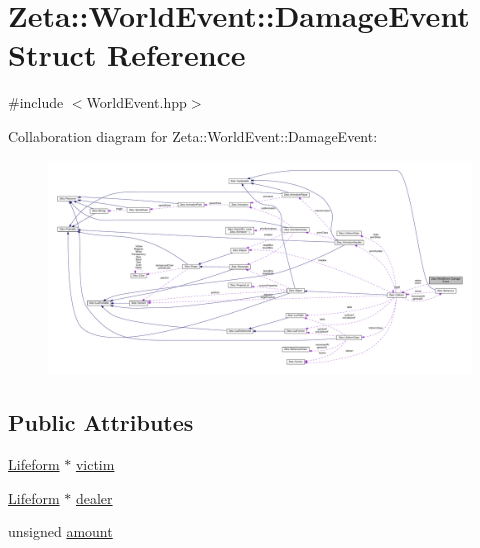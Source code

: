 \hypertarget{structZeta_1_1WorldEvent_1_1DamageEvent}{\section{Zeta\+:\+:World\+Event\+:\+:Damage\+Event Struct Reference}
\label{structZeta_1_1WorldEvent_1_1DamageEvent}
}


{\ttfamily \#include $<$World\+Event.\+hpp$>$}



Collaboration diagram for Zeta\+:\+:World\+Event\+:\+:Damage\+Event\+:
\nopagebreak
\begin{figure}[H]
\begin{center}
\leavevmode
\includegraphics[width=350pt]{structZeta_1_1WorldEvent_1_1DamageEvent__coll__graph}
\end{center}
\end{figure}
\subsection*{Public Attributes}
\begin{DoxyCompactItemize}
\item 
\hyperlink{classZeta_1_1Lifeform}{Lifeform} $\ast$ \hyperlink{structZeta_1_1WorldEvent_1_1DamageEvent_ad4e847d07d5ac8dce777c67366e1284d}{victim}
\item 
\hyperlink{classZeta_1_1Lifeform}{Lifeform} $\ast$ \hyperlink{structZeta_1_1WorldEvent_1_1DamageEvent_aade109eb1787736c4058c174d744636a}{dealer}
\item 
unsigned \hyperlink{structZeta_1_1WorldEvent_1_1DamageEvent_a975b2f7cd9156f2e20a57bbd32ed28c1}{amount}
\end{DoxyCompactItemize}



